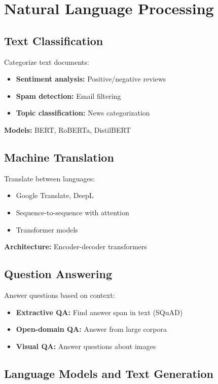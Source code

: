 
\section{Natural Language Processing}
\label{sec:nlp-applications}

\subsection{Text Classification}

Categorize text documents:
\begin{itemize}
    \item \textbf{Sentiment analysis:} Positive/negative reviews
    \item \textbf{Spam detection:} Email filtering
    \item \textbf{Topic classification:} News categorization
\end{itemize}

\textbf{Models:} BERT, RoBERTa, DistilBERT

\subsection{Machine Translation}

Translate between languages:
\begin{itemize}
    \item Google Translate, DeepL
    \item Sequence-to-sequence with attention
    \item Transformer models
\end{itemize}

\textbf{Architecture:} Encoder-decoder transformers

\subsection{Question Answering}

Answer questions based on context:
\begin{itemize}
    \item \textbf{Extractive QA:} Find answer span in text (SQuAD)
    \item \textbf{Open-domain QA:} Answer from large corpora
    \item \textbf{Visual QA:} Answer questions about images
\end{itemize}

\subsection{Language Models and Text Generation}

